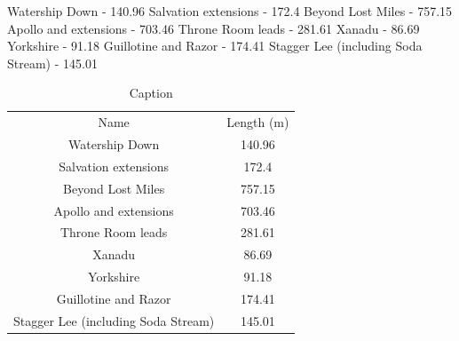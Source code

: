 
Watership Down - 140.96
Salvation extensions - 172.4
Beyond Lost Miles - 757.15
Apollo and extensions - 703.46
Throne Room leads - 281.61
Xanadu - 86.69
Yorkshire - 91.18
Guillotine and Razor - 174.41
Stagger Lee (including Soda Stream) - 145.01


\begin{table}
    \centering
    \begin{tabular}{cc}
    Name & Length (m)\\
    Watership Down & 140.96\\
    Salvation extensions     & 172.4\\
    Beyond Lost Miles     & 757.15\\
    Apollo and extensions     & 703.46\\
    Throne Room leads     & 281.61\\
    Xanadu     & 86.69\\
    Yorkshire     & 91.18\\
    Guillotine and Razor     & 174.41\\
    Stagger Lee (including Soda Stream)     & 145.01\\
    \end{tabular}
    \caption{Caption}
    \label{tab:my_label}
\end{table}

